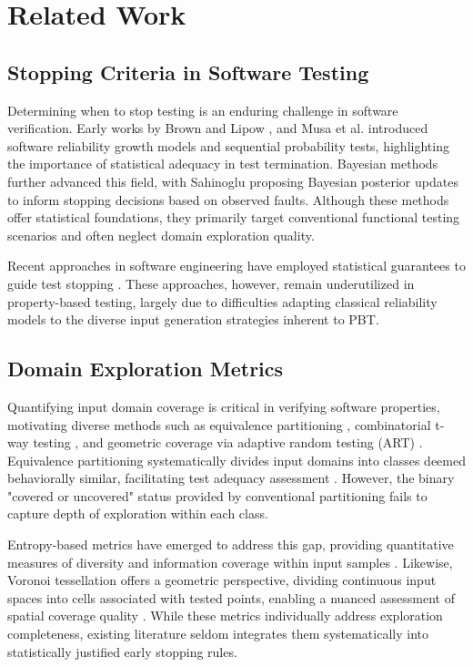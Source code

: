 \section{Related Work}

\subsection{Stopping Criteria in Software Testing}
Determining when to stop testing is an enduring challenge in software verification. Early works by Brown and Lipow \cite{Brown1975}, and Musa et al. \cite{Musa1987} introduced software reliability growth models and sequential probability tests, highlighting the importance of statistical adequacy in test termination. Bayesian methods further advanced this field, with Sahinoglu \cite{Sahinoglu2003} proposing Bayesian posterior updates to inform stopping decisions based on observed faults. Although these methods offer statistical foundations, they primarily target conventional functional testing scenarios and often neglect domain exploration quality.

Recent approaches in software engineering have employed statistical guarantees to guide test stopping \cite{Whittaker1994, Bertolino2010}. These approaches, however, remain underutilized in property-based testing, largely due to difficulties adapting classical reliability models to the diverse input generation strategies inherent to PBT.

\subsection{Domain Exploration Metrics}
Quantifying input domain coverage is critical in verifying software properties, motivating diverse methods such as equivalence partitioning \cite{Ostrand1988}, combinatorial t-way testing \cite{Kuhn1984}, and geometric coverage via adaptive random testing (ART) \cite{Chen2007}. Equivalence partitioning systematically divides input domains into classes deemed behaviorally similar, facilitating test adequacy assessment \cite{Ostrand1988}. However, the binary "covered or uncovered" status provided by conventional partitioning fails to capture depth of exploration within each class.

Entropy-based metrics have emerged to address this gap, providing quantitative measures of diversity and information coverage within input samples \cite{Xu2016, Shi2014, Huang2003}. Likewise, Voronoi tessellation offers a geometric perspective, dividing continuous input spaces into cells associated with tested points, enabling a nuanced assessment of spatial coverage quality \cite{Shahbazi2013}. While these metrics individually address exploration completeness, existing literature seldom integrates them systematically into statistically justified early stopping rules.

